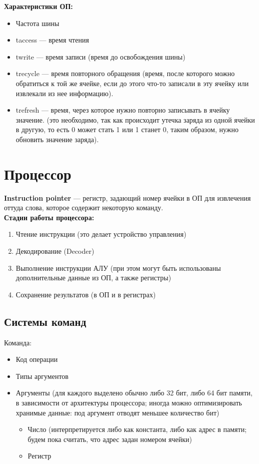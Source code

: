 \textbf{Характеристики ОП:}
\begin{itemize}
\item Частота шины
\item taccess --- время чтения
\item twrite --- время записи (время до освобождения шины)
\item trecycle --- время повторного обращения (время, после которого можно обратиться к той же ячейке, если до этого что-то записали в эту ячейку или извлекали из нее информацию).
\item trefresh --- время, через которое нужно повторно записывать в ячейку значение. (это необходимо, так как происходит утечка заряда из одной ячейки в другую, то есть 0 может стать 1 или 1 станет 0, таким образом, нужно обновить значение заряда).
\end{itemize}

\section{Процессор}

\textbf{Instruction pointer} --- регистр, задающий номер ячейки в ОП для извлечения оттуда слова, которое содержит некоторую команду.
\\

\textbf{Стадии работы процессора:}
\begin{enumerate}
\item Чтение инструкции (это делает устройство управления)
\item Декодирование (Decoder)
\item Выполнение инструкции АЛУ (при этом могут быть использованы дополнительные данные из ОП, а также регистры)
\item Сохранение результатов (в ОП и в регистрах)
\end{enumerate}

\subsection{Системы команд}

Команда:
\begin{itemize}
\item Код операции
\item Типы аргументов
\item Аргументы (для каждого выделено обычно либо 32 бит, либо 64 бит памяти, в зависимости от архитектуры процессора; иногда можно оптимизировать хранимые данные: под аргумент отводят меньшее количество бит)
\begin{itemize}
\item Число (интерпретируется либо как константа, либо как адрес в памяти; будем пока считать, что адрес задан номером ячейки)
\item Регистр
\end{itemize}
\end{itemize}


